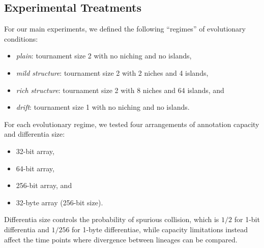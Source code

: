 \subsection{Experimental Treatments}

For our main experiments, we defined the following ``regimes'' of evolutionary conditions:
\begin{itemize}
  \item \textit{plain}: tournament size 2 with no niching and no islands,
  \item \textit{mild structure}: tournament size 2 with 2 niches and 4 islands,
  \item \textit{rich structure}: tournament size 2 with 8 niches and 64 islands, and
  \item \textit{drift}: tournament size 1 with no niching and no islands.
\end{itemize}



For each evolutionary regime, we tested four arrangements of annotation capacity and differentia size:
\begin{itemize}
  \item 32-bit array,
  \item 64-bit array,
  \item 256-bit array, and
  \item 32-byte array (256-bit size).
\end{itemize}

Differentia size controls the probability of spurious collision, which is $1/2$ for 1-bit differentia and $1/256$ for 1-byte differentiae, while capacity limitations instead affect the time points where divergence between lineages can be compared.

